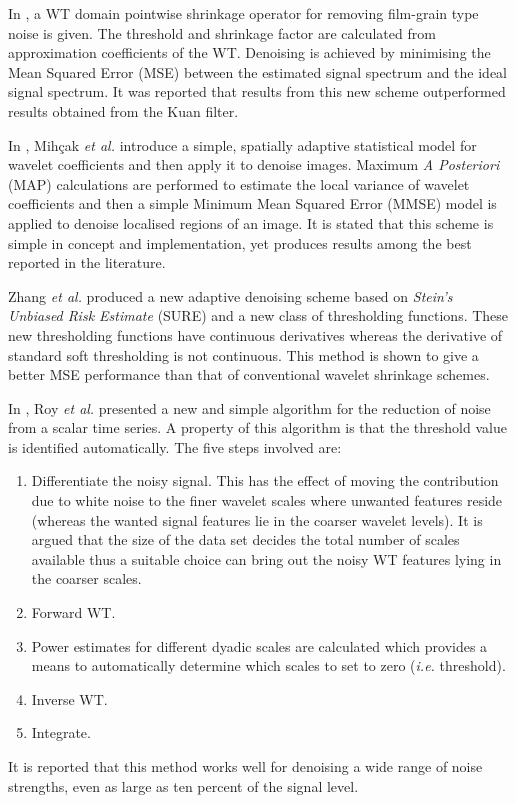 \documentclass[12pt]{report}
\begin{document}
In \cite{oktemFilmGrain}, a WT domain pointwise shrinkage operator for removing
film-grain type noise is given. 
The threshold and shrinkage factor are calculated from approximation coefficients of the 
WT.
Denoising is achieved by minimising the Mean Squared 
Error (MSE) between the estimated signal spectrum and the ideal signal spectrum.
It was reported that results from this new scheme outperformed results obtained from the Kuan filter.


In \cite{kivanc}, Mih\c{c}ak \emph{et al.} introduce a simple, spatially adaptive statistical model
for wavelet coefficients and then apply it to denoise images.
Maximum \emph{A Posteriori} (MAP) calculations are performed to estimate the local variance
of wavelet coefficients and then a simple Minimum Mean Squared Error (MMSE) model is applied 
to denoise localised regions of an image. It is stated that this scheme is simple in concept
and implementation, yet produces results among the best reported in the literature. 

Zhang \emph{et al.} \cite{zhangSURE} produced a new adaptive denoising scheme based on \emph{Stein's Unbiased
Risk Estimate} (SURE) and a new class of thresholding functions. These new thresholding functions have continuous
derivatives whereas the derivative of standard soft thresholding is not continuous. This method
is shown to give a better MSE performance than that of conventional wavelet shrinkage schemes.

In \cite{roySimple}, Roy \emph{et al.} presented a new and simple algorithm for the reduction of noise from a scalar
time series. A property of this algorithm is that the threshold value is identified automatically. 
The five steps involved are:
\begin{enumerate}
	\item Differentiate the noisy signal. This has the effect of moving the contribution due
	to white noise to the finer wavelet scales where unwanted features reside (whereas the wanted
	signal features lie in the coarser wavelet levels). It is argued that the size of the
	data set decides the total number of scales available thus a suitable choice can bring out
	the noisy WT features lying in the coarser scales.
	\item Forward WT.
	\item Power estimates for different dyadic scales are calculated which provides a means 
	to automatically determine which scales to set to zero (\emph{i.e.} threshold).
	\item Inverse WT.
	\item Integrate.
\end{enumerate}
It is reported that this method works well for denoising a wide range of noise strengths, even as large as 
ten percent of the signal level.
\end{document}
